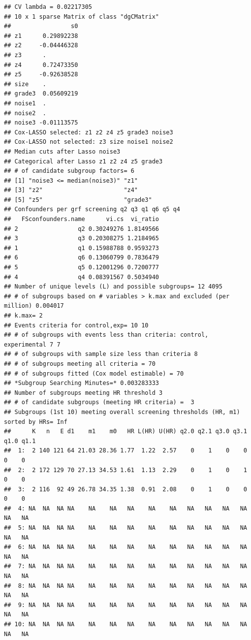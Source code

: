 \documentclass[smallextended]{svjour3}
\makeatletter
\newenvironment{kframe}{%
 \def\at@end@of@kframe{}%
 \ifinner\ifhmode%
  \def\at@end@of@kframe{\end{minipage}}%
  \begin{minipage}{\columnwidth}%
 \fi\fi%
 \def\FrameCommand##1{\hskip\@totalleftmargin \hskip-\fboxsep
 \colorbox{shadecolor}{##1}\hskip-\fboxsep
     \hskip-\linewidth \hskip-\@totalleftmargin \hskip\columnwidth}%
 \MakeFramed {\advance\hsize-\width
   \@totalleftmargin\z@ \linewidth\hsize
   \@setminipage}}%
 {\par\unskip\endMakeFramed%
 \at@end@of@kframe}
\newenvironment{knitrout}{}{} %
\makeatother
\begin{document}
\begin{knitrout}
\begin{kframe}
\begin{verbatim}
## CV lambda = 0.02217305 
## 10 x 1 sparse Matrix of class "dgCMatrix"
##                 s0
## z1      0.29892238
## z2     -0.04446328
## z3      .         
## z4      0.72473350
## z5     -0.92638528
## size    .         
## grade3  0.05609219
## noise1  .         
## noise2  .         
## noise3 -0.01113575
## Cox-LASSO selected: z1 z2 z4 z5 grade3 noise3 
## Cox-LASSO not selected: z3 size noise1 noise2 
## Median cuts after Lasso noise3 
## Categorical after Lasso z1 z2 z4 z5 grade3 
## # of candidate subgroup factors= 6 
## [1] "noise3 <= median(noise3)" "z1"                      
## [3] "z2"                       "z4"                      
## [5] "z5"                       "grade3"                  
## Confounders per grf screening q2 q3 q1 q6 q5 q4 
##   FSconfounders.name      vi.cs  vi_ratio
## 2                 q2 0.30249276 1.8149566
## 3                 q3 0.20308275 1.2184965
## 1                 q1 0.15988788 0.9593273
## 6                 q6 0.13060799 0.7836479
## 5                 q5 0.12001296 0.7200777
## 4                 q4 0.08391567 0.5034940
## Number of unique levels (L) and possible subgroups= 12 4095 
## # of subgroups based on # variables > k.max and excluded (per million) 0.004017 
## k.max= 2 
## Events criteria for control,exp= 10 10 
## # of subgroups with events less than criteria: control, experimental 7 7 
## # of subgroups with sample size less than criteria 8 
## # of subgroups meeting all criteria = 70 
## # of subgroups fitted (Cox model estimable) = 70 
## *Subgroup Searching Minutes=* 0.003283333 
## Number of subgroups meeting HR threshold 3 
## # of candidate subgroups (meeting HR criteria) =  3 
## Subgroups (1st 10) meeting overall screening thresholds (HR, m1) sorted by HRs= Inf 
##      K   n   E d1    m1    m0   HR L(HR) U(HR) q2.0 q2.1 q3.0 q3.1 q1.0 q1.1
##  1:  2 140 121 64 21.03 28.36 1.77  1.22  2.57    0    1    0    0    0    0
##  2:  2 172 129 70 27.13 34.53 1.61  1.13  2.29    0    1    0    1    0    0
##  3:  2 116  92 49 26.78 34.35 1.38  0.91  2.08    0    1    0    0    0    0
##  4: NA  NA  NA NA    NA    NA   NA    NA    NA   NA   NA   NA   NA   NA   NA
##  5: NA  NA  NA NA    NA    NA   NA    NA    NA   NA   NA   NA   NA   NA   NA
##  6: NA  NA  NA NA    NA    NA   NA    NA    NA   NA   NA   NA   NA   NA   NA
##  7: NA  NA  NA NA    NA    NA   NA    NA    NA   NA   NA   NA   NA   NA   NA
##  8: NA  NA  NA NA    NA    NA   NA    NA    NA   NA   NA   NA   NA   NA   NA
##  9: NA  NA  NA NA    NA    NA   NA    NA    NA   NA   NA   NA   NA   NA   NA
## 10: NA  NA  NA NA    NA    NA   NA    NA    NA   NA   NA   NA   NA   NA   NA

\end{verbatim}
\end{kframe}
\end{knitrout}
\end{document}
